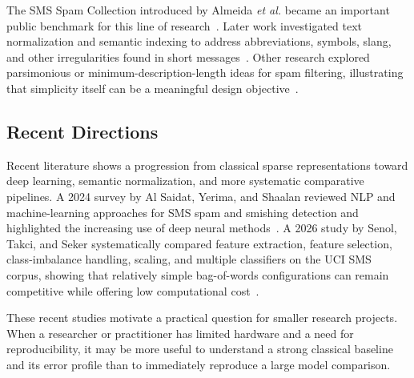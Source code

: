 \documentclass[conference]{IEEEtran}
\begin{document}
The SMS Spam Collection introduced by Almeida \textit{et al.} became an important public benchmark for this line of research~\cite{almeida2011sms}. Later work investigated text normalization and semantic indexing to address abbreviations, symbols, slang, and other irregularities found in short messages~\cite{almeida2016normalization}. Other research explored parsimonious or minimum-description-length ideas for spam filtering, illustrating that simplicity itself can be a meaningful design objective~\cite{almeida2012occam}.

\subsection{Recent Directions}
Recent literature shows a progression from classical sparse representations toward deep learning, semantic normalization, and more systematic comparative pipelines. A 2024 survey by Al Saidat, Yerima, and Shaalan reviewed NLP and machine-learning approaches for SMS spam and smishing detection and highlighted the increasing use of deep neural methods~\cite{saidat2024survey}. A 2026 study by Senol, Takci, and Seker systematically compared feature extraction, feature selection, class-imbalance handling, scaling, and multiple classifiers on the UCI SMS corpus, showing that relatively simple bag-of-words configurations can remain competitive while offering low computational cost~\cite{senol2026pipeline}.

These recent studies motivate a practical question for smaller research projects. When a researcher or practitioner has limited hardware and a need for reproducibility, it may be more useful to understand a strong classical baseline and its error profile than to immediately reproduce a large model comparison.
\end{document}
